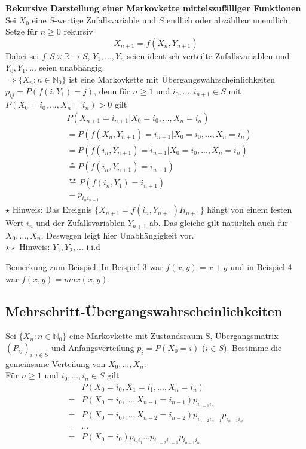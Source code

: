 \documentclass[a4paper,12pt]{article}
\begin{document}
\begin{tcolorbox}[breakable, colframe=blue, colback=white, title=Beispiel 5]
	\textbf{Rekursive Darstellung einer Markovkette mittelszufälliger Funktionen}
	Sei $X_0$ eine $S$-wertige Zufallsvariable und $S$ endlich oder abzählbar unendlich. Setze für $n \geq 0$ rekursiv
	$$
		X_{n+1} = f(X_n,Y_{n+1})
	$$
	Dabei sei $ f: S \times \mathbb{R} \to S$, $Y_1, ..., Y_n$ seien identisch verteilte Zufallsvariablen und $Y_0, Y_1, ...$ seien unabhängig.\\
	$\Rightarrow \{X_n: n \in  \mathbb{N}_0\}$ ist eine Markovkette mit Übergangswahrscheinlichkeiten $p_{ij}=P(f(i,Y_1)=j)$, denn für $n \geq 1$ und $i_0, ..., i_{n+1} \in S$ mit $P(X_0 = i_0, ..., X_n = i_n)>0$ gilt
	\begin{align*}
		 & P(X_{n+1}=i_{n+1}|X_0 = i_0, ..., X_n = i_n)            \\
		 & =  P(f(X_n, Y_{n+1})=i_{n+1}|X_0 = i_0, ..., X_n = i_n) \\
		 & =  P(f(i_n, Y_{n+1})=i_{n+1}|X_0 = i_0, ..., X_n = i_n) \\
		 & \overset{\star}{=}  P(f(i_n, Y_{n+1})=i_{n+1})          \\
		 & \overset{\star \star}{=}   P(f(i_n, Y_1)=i_{n+1})       \\
		 & =  p_{i_ni_{n+1}}
	\end{align*}
	$\star$ Hinweis: Das Ereignis $\{X_{n+1} =f(i_n,Y_{n+1})Ii_{n+1}\}$ hängt von einem festen Wert $i_n$ und der Zufallsvariablen $Y_{n+1}$ ab.
	Das gleiche gilt natürlich auch für $X_0, ..., X_n$. Deswegen leigt hier Unabhängigkeit vor.\\
	$\star \star$ Hinweis: $Y_1, Y_2, ...$ i.i.d
\end{tcolorbox}

Bemerkung zum Beispiel: In Beispiel 3 war $f(x,y) = x+y$ und in Beispiel 4 war $f(x,y) = max(x,y)$.



\subsection{Mehrschritt-Übergangswahrscheinlichkeiten}
Sei $\{X_n: n \in \mathbb{N}_0\}$ eine Markovkette mit Zustandsraum S, Übergangsmatrix $(P_{ij})_{i,j \in S}$ und
Anfangsverteilung $p_i = P(X_0 = i)$ ($i \in S$).
Bestimme die gemeinsame Verteilung von $X_0, ..., X_n$:\\
Für $n \geq 1$ und $i_0, ..., i_n \in S$ gilt
\begin{align*}
	  & P(X_0 = i_0, X_1 = i_1, ..., X_n = i_n)                              \\
	= & P(X_0 = i_0, ..., X_{n-1}=i_{n-1})p_{i_{n-1}i_n}                     \\
	= & P(X_0 = i_0, ..., X_{n-2} = i_{n-2})p_{i_{n-2}i_{n-1}}p_{i_{n-1}i_n} \\
	= & \dots                                                                \\
	= & P(X_0 = i_0)p_{i_0i_1}...p_{i_{n-2}i_{n-1}}p_{i_{n-1}i_n}
\end{align*}
\end{document}

